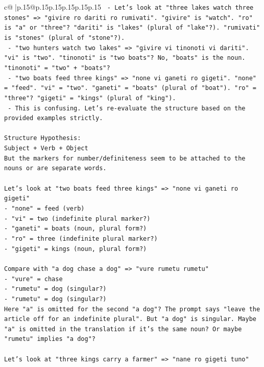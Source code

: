 \documentclass{article}
\begin{document}
{\begin{supertabular}{c@{$\;$}|p{.15\linewidth}@{}p{.15\linewidth}p{.15\linewidth}p{.15\linewidth}p{.15\linewidth}p{.15\linewidth}}
{{{\texttt{  {-} Let's look at "three lakes watch three stones" => "givire ro dariti ro rumivati". "givire" is "watch". "ro" is "a" or "three"? "dariti" is "lakes" (plural of "lake"?). "rumivati" is "stones" (plural of "stone"?).} \\
\texttt{  {-} "two hunters watch two lakes" => "givire vi tinonoti vi dariti". "vi" is "two". "tinonoti" is "two boats"? No, "boats" is the noun. "tinonoti" = "two" + "boats"?} \\
\texttt{  {-} "two boats feed three kings" => "none vi ganeti ro gigeti". "none" = "feed". "vi" = "two". "ganeti" = "boats" (plural of "boat"). "ro" = "three"? "gigeti" = "kings" (plural of "king").} \\
\texttt{  {-} This is confusing. Let's re{-}evaluate the structure based on the provided examples strictly.} \\
\\ 
\texttt{Structure Hypothesis:} \\
\texttt{Subject + Verb + Object} \\
\texttt{But the markers for number/definiteness seem to be attached to the nouns or are separate words.} \\
\\ 
\texttt{Let's look at "two boats feed three kings" => "none vi ganeti ro gigeti"} \\
\texttt{{-} "none" = feed (verb)} \\
\texttt{{-} "vi" = two (indefinite plural marker?)} \\
\texttt{{-} "ganeti" = boats (noun, plural form?)} \\
\texttt{{-} "ro" = three (indefinite plural marker?)} \\
\texttt{{-} "gigeti" = kings (noun, plural form?)} \\
\\ 
\texttt{Compare with "a dog chase a dog" => "vure rumetu rumetu"} \\
\texttt{{-} "vure" = chase} \\
\texttt{{-} "rumetu" = dog (singular?)} \\
\texttt{{-} "rumetu" = dog (singular?)} \\
\texttt{Here "a" is omitted for the second "a dog"? The prompt says "leave the article off for an indefinite plural". But "a dog" is singular. Maybe "a" is omitted in the translation if it's the same noun? Or maybe "rumetu" implies "a dog"?} \\
\\ 
\texttt{Let's look at "three kings carry a farmer" => "nane ro gigeti tuno"} \\
}}}
\end{supertabular}}
\end{document}
